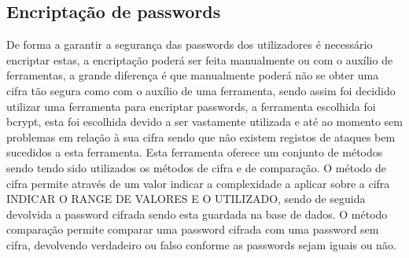 \subsection{Encriptação de passwords}
De forma a garantir a segurança das passwords dos utilizadores é necessário encriptar estas, a encriptação poderá ser feita manualmente ou com o auxílio de ferramentas, a grande diferença é que manualmente poderá não se obter uma cifra tão segura como com o auxílio de uma ferramenta, sendo assim foi decidido utilizar uma ferramenta para encriptar passwords, a ferramenta escolhida foi bcrypt, esta foi escolhida devido a ser vastamente utilizada e até ao momento sem problemas em relação à sua cifra sendo que não existem registos de ataques bem sucedidos a esta ferramenta. Esta ferramenta oferece um conjunto de métodos sendo tendo sido utilizados os métodos de cifra e de comparação. O método de cifra permite através de um valor indicar a complexidade a aplicar sobre a cifra INDICAR O RANGE DE VALORES E O UTILIZADO, sendo de seguida devolvida a password cifrada sendo esta guardada na base de dados. O método comparação permite comparar uma password cifrada com uma password sem cifra, devolvendo verdadeiro ou falso conforme as passwords sejam iguais ou não.